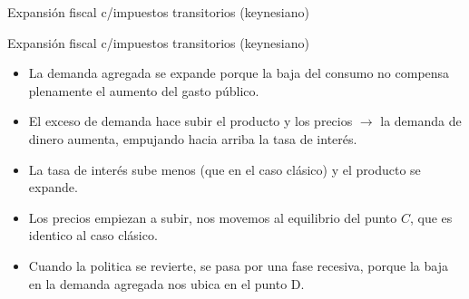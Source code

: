 \documentclass{beamer}
\begin{document}
\begin{frame}{Expansión fiscal c/impuestos transitorios (keynesiano)}
\begin{center}
\begin{figure}[H]
\begin{center}
\begin{minipage}[b]{0.45\textwidth}
\begin{center}
        \end{center}
        \end{minipage}
        \end{center}
        \end{figure}
    \end{center} 
\end{frame}

\begin{frame}{Expansión fiscal c/impuestos transitorios (keynesiano)}
   
\begin{itemize}
    \item La demanda agregada se expande porque la baja del consumo no compensa plenamente el aumento del gasto público.
    \item El exceso de demanda hace subir el producto y los precios $\rightarrow$ la demanda de dinero aumenta, empujando hacia arriba la tasa de interés.
    \item La tasa de interés sube menos (que en el caso clásico) y el producto se expande.
    \item Los precios empiezan a subir, nos movemos al equilibrio del punto $C$, que es identico al caso clásico.
    \item Cuando la politica se revierte, se pasa por una fase recesiva, porque la baja en la demanda agregada nos ubica en el punto D.
\end{itemize}
    
\end{frame}
\end{document}
